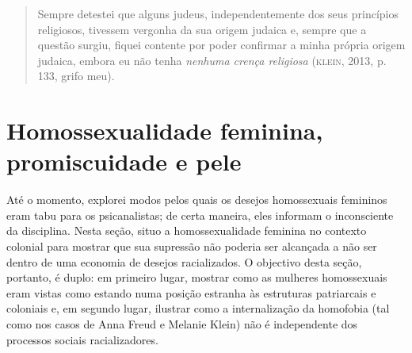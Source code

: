 \begin{quote}
Sempre detestei que alguns judeus, independentemente dos seus
princípios religiosos, tivessem vergonha da sua origem judaica e, sempre
que a questão surgiu, fiquei contente por poder confirmar a minha
própria origem judaica, embora eu não tenha \emph{nenhuma crença
religiosa} (\textsc{klein}, 2013, p. 133, grifo meu).
\end{quote}

\section{Homossexualidade feminina, promiscuidade e pele}

Até o momento, explorei modos pelos quais os desejos homossexuais
femininos eram tabu para os psicanalistas; de certa maneira, eles
informam o inconsciente da disciplina. Nesta seção, situo a
homossexualidade feminina no contexto colonial para mostrar que sua
supressão não poderia ser alcançada a não ser dentro de uma economia de
desejos racializados. O objectivo desta seção, portanto, é duplo: em
primeiro lugar, mostrar como as mulheres homossexuais eram vistas como
estando numa posição estranha às estruturas patriarcais e coloniais e,
em segundo lugar, ilustrar como a internalização da homofobia (tal como
nos casos de Anna Freud e Melanie Klein) não é independente dos
processos sociais racializadores.

